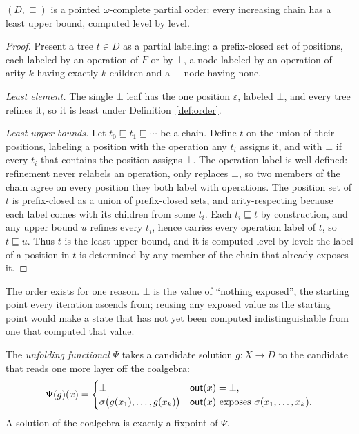 \begin{proposition}\label{prop:order}
  $(D, \sqsubseteq)$ is a pointed $\omega$-complete partial order: every increasing chain has a least upper bound, computed level by level.
\end{proposition}
\begin{proof}
  Present a tree $t \in D$ as a partial labeling: a prefix-closed set of positions, each labeled by an operation of $F$ or by $\bot$, a node labeled by an operation of arity $k$ having exactly $k$ children and a $\bot$ node having none.

  \emph{Least element.} The single $\bot$ leaf has the one position $\varepsilon$, labeled $\bot$, and every tree refines it, so it is least under Definition~\ref{def:order}.

  \emph{Least upper bounds.} Let $t_0 \sqsubseteq t_1 \sqsubseteq \cdots$ be a chain. Define $t$ on the union of their positions, labeling a position with the operation any $t_i$ assigns it, and with $\bot$ if every $t_i$ that contains the position assigns $\bot$. The operation label is well defined: refinement never relabels an operation, only replaces $\bot$, so two members of the chain agree on every position they both label with operations. The position set of $t$ is prefix-closed as a union of prefix-closed sets, and arity-respecting because each label comes with its children from some $t_i$. Each $t_i \sqsubseteq t$ by construction, and any upper bound $u$ refines every $t_i$, hence carries every operation label of $t$, so $t \sqsubseteq u$. Thus $t$ is the least upper bound, and it is computed level by level: the label of a position in $t$ is determined by any member of the chain that already exposes it.
\end{proof}

The order exists for one reason. $\bot$ is the value of ``nothing exposed'', the starting point every iteration ascends from; reusing any exposed value as the starting point would make a state that has not yet been computed indistinguishable from one that computed that value.

\begin{definition}\label{def:unfolding}
  The \emph{unfolding functional} $\Psi$ takes a candidate solution $g \colon X \to D$ to the candidate that reads one more layer off the coalgebra:
  \[
    \Psi(g)(x) =
    \begin{cases}
      \bot & \mathsf{out}(x) = \bot,\\
      \sigma\big(g(x_1), \dots, g(x_k)\big) & \mathsf{out}(x) \text{ exposes } \sigma(x_1, \dots, x_k).
    \end{cases}
  \]
  A solution of the coalgebra is exactly a fixpoint of $\Psi$.
\end{definition}

